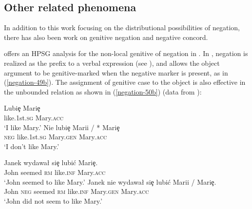 \documentclass[output=paper
	        ,collection
	        ,collectionchapter
 	        ,biblatex
                ,babelshorthands
                ,newtxmath
                ,draftmode
                ,colorlinks, citecolor=brown
]{langscibook}
\begin{document}
\begin{exe}
\begin{xlist}
\iffalse{
The VSO language \ili{Welsh} also employs a preverbal
negative, as illustrated by \citet{BJ:00}:

\ea
\ex \label{negation-NC-1a}
\gll Ni chaf sefyll yma \\
     \textsc{neg} can stand here\\
\glt `I can't stand here.'
\z
%
As given in (\ref{negation-NC-1a}), \ili{Welsh} allows the preverbal
particle \type{ni} to occur in the preverbal position.
%
With treating the negative particle to form a negative word
with the following stem, \citet{BJ:00} offer a selectional
analysis of negation.
That is, the finite negative verb selects
two complements (e.g., subject and object) while
the non-finite negative verb selects a VP.}\fi

\section{Other related phenomena}

In addition to this work focusing on the distributional possibilities
 of negation, there has also been work on genitive negation and negative concord.

 \citet{Prz:00} offers an HPSG analysis for the non-local genitive of negation in .
 In , negation is realized as the prefix  to a verbal expression (see \citealt{PK:99, Prz:00, Prz:01}), and
  allows the object argument to be genitive-marked when the negative marker is present, as in (\ref{negation-49b}).
  The assignment of genitive case to the object is also effective in
  the unbounded relation as shown in (\ref{negation-50b}) (data from \citealt[]{Prz:00}):

\eal
\ex  \label{negation-genitive}
\gll Lubi\c{e} Mari\c{e} \\
     like.1st.\textsc{sg} Mary.\textsc{acc}\\%
\glt `I like Mary.'
\ex \label{negation-49b}
\gll Nie lubi\c{e} Marii / * Mari\c{e} \\
     \textsc{neg} like.1st.\textsc{sg} Mary.\textsc{gen} {} {} Mary.\textsc{acc}\\
\glt `I don't like Mary.'
\zl

\eal
\ex \label{negation-genitive-1}
\gll  Janek wydawa\l{} si\c{e} lubi\'{c} Mari\c{e}.\\
      John seemed \textsc{rm}     like.\textsc{inf} Mary.\textsc{acc}\\%
\glt `John seemed to like Mary.'
\ex \label{negation-50b}
\gll  Janek nie wydawa\l{} si\c{e} lubi\'{c} Marii / Mari\c{e}.\\
      John \textsc{neg} seemed \textsc{rm} like.\textsc{inf}      Mary.\textsc{gen} {} Mary.\textsc{acc}\\
\glt `John did not seem to like Mary.'
\zl


\end{xlist}
\end{exe}
\end{document}
